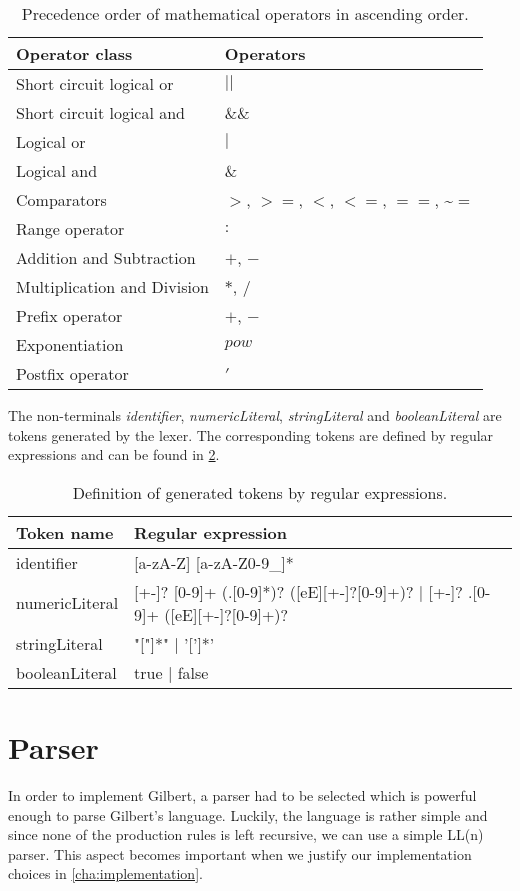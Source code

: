 \begin{table}
	\centering
	\begin{tabular}{l|l}
	Operator class & Operators\\
	\hline
	Short circuit logical or & $||$\\
	Short circuit logical and & $\&\&$\\
	Logical or & $|$ \\
	Logical and & $\&$ \\
	Comparators & $>$, $>=$, $<$, $<=$, $==$, \textasciitilde$=$\\
	Range operator & $:$ \\
	Addition and Subtraction & $+$, $-$\\
	Multiplication and Division & $*$, $/$\\
	Prefix operator & $+$, $-$\\
	Exponentiation & $pow$\\
	Postfix operator & $'$
	\end{tabular}
	\caption{Precedence order of mathematical operators in ascending order.}
	\label{tab:precedences}
\end{table}

The non-terminals \emph{identifier}, \emph{numericLiteral}, \emph{stringLiteral} and \emph{booleanLiteral} are tokens generated by the lexer. The corresponding tokens are defined by regular expressions and can be found in \cref{tab:tokens}.

\begin{table}
	\centering
	\begin{tabular}{l|l}
	Token name & Regular expression\\
	\hline
	identifier & [a-zA-Z] [a-zA-Z0-9\_]*\\
	numericLiteral & [+-]? [0-9]+ (.[0-9]*)? ([eE][+-]?[0-9]+)? | [+-]? .[0-9]+ ([eE][+-]?[0-9]+)? \\
	stringLiteral & "["]*" | '[']*'\\
	booleanLiteral & true | false
	\end{tabular}
	\caption{Definition of generated tokens by regular expressions.}
	\label{tab:tokens}
\end{table}

\section{Parser}

In order to implement Gilbert, a parser had to be selected which is powerful enough to parse Gilbert's language.
Luckily, the language is rather simple and since none of the production rules is left recursive, we can use a simple LL(n) parser.
This aspect becomes important when we justify our implementation choices in \cref{cha:implementation}.

